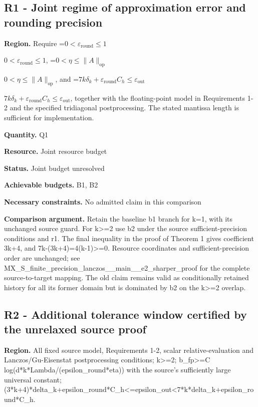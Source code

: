 \documentclass[10pt,a4paper]{article}
\newcommand{\AtlasMath}[1]{\par\begingroup\centering\setbox0=\hbox{$\displaystyle #1$}\ifdim\wd0>1.4\linewidth\typeout{ATLAS WIDE FORMULA: \the\wd0}\fi\ifdim\wd0>\linewidth\resizebox{\linewidth}{!}{\box0}\else\box0\fi\par\endgroup}
\newcommand{\AtlasInlineMath}[1]{\begingroup\setbox0=\hbox{$#1$}\ifdim\wd0>.4\linewidth\endgroup\AtlasMath{#1}\else\endgroup$#1$\fi}
\begin{document}
\subsection{R1 - Joint regime of approximation error and rounding precision}
\textbf{Region.} Require \AtlasInlineMath{0<\varepsilon_{\mathrm{round}}\le1}, \AtlasInlineMath{0<\eta\le\|A\|_{\mathrm{op}}}, and \AtlasInlineMath{7k\delta_k+\varepsilon_{\mathrm{round}}C_h\le\varepsilon_{\mathrm{out}}}, together with the floating-point model in Requirements 1-2 and the specified tridiagonal postprocessing. The stated mantissa length is sufficient for implementation.

\textbf{Quantity.} Q1

\textbf{Resource.} Joint resource budget

\textbf{Status.} Joint budget unresolved

\textbf{Achievable budgets.} B1, B2

\textbf{Necessary constraints.} No admitted claim in this comparison

\textbf{Comparison argument.} Retain the baseline b1 branch for k=1, with its unchanged source guard. For k>=2 use b2 under the source sufficient-precision conditions and r1. The final inequality in the proof of Theorem 1 gives coefficient 3k+4, and 7k-(3k+4)=4(k-1)>=0. Resource coordinates and sufficient-precision order are unchanged; see MX\_\allowbreak{}S\_\allowbreak{}finite\_\allowbreak{}precision\_\allowbreak{}lanczos\_\allowbreak{}\_\allowbreak{}main\_\allowbreak{}\_\allowbreak{}e2\_\allowbreak{}sharper\_\allowbreak{}proof for the complete source-to-target mapping. The old claim remains valid as conditionally retained history for all its former domain but is dominated by b2 on the k>=2 overlap.

\subsection{R2 - Additional tolerance window certified by the unrelaxed source proof}
\textbf{Region.} All fixed source model, Requirements 1-2, scalar relative-evaluation and Lanczos/Gu-Eisenstat postprocessing conditions; k>=2; b\_\allowbreak{}fp>=C log(d*k*Lambda/(epsilon\_\allowbreak{}round*eta)) with the source's sufficiently large universal constant; (3*k+4)*delta\_\allowbreak{}k+epsilon\_\allowbreak{}round*C\_\allowbreak{}h<=epsilon\_\allowbreak{}out<7*k*delta\_\allowbreak{}k+epsilon\_\allowbreak{}round*C\_\allowbreak{}h.
\end{document}
